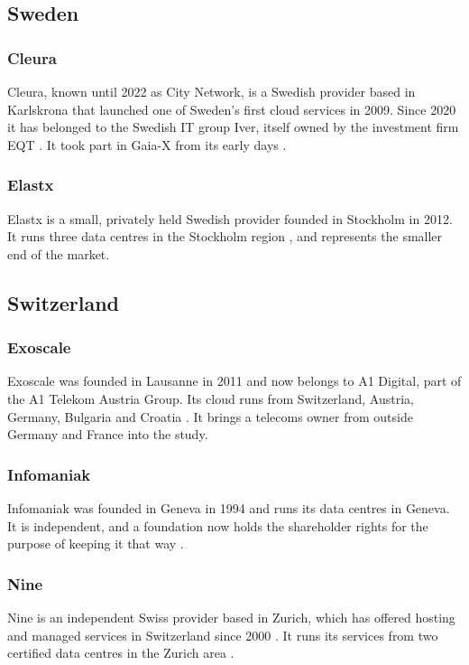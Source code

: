 \subsection{Sweden}

\subsubsection*{Cleura}
Cleura, known until 2022 as City Network, is a Swedish provider based in
Karlskrona that launched one of Sweden's first cloud services in 2009. Since 2020
it has belonged to the Swedish IT group Iver, itself owned by the investment firm
EQT \cite{Cleura_About,Cleura_Iver_2020}. It took part in Gaia-X from its early
days \cite{Cleura_GaiaX_2020}.

\subsubsection*{Elastx}
Elastx is a small, privately held Swedish provider founded in Stockholm in 2012.
It runs three data centres in the Stockholm region \cite{Elastx_About}, and
represents the smaller end of the market.

\subsection{Switzerland}

\subsubsection*{Exoscale}
Exoscale was founded in Lausanne in 2011 and now belongs to A1 Digital, part of
the A1 Telekom Austria Group. Its cloud runs from Switzerland, Austria, Germany,
Bulgaria and Croatia \cite{Exoscale_About}. It brings a telecoms owner from outside
Germany and France into the study.

\subsubsection*{Infomaniak}
Infomaniak was founded in Geneva in 1994 and runs its data centres in Geneva. It
is independent, and a foundation now holds the shareholder rights for the purpose
of keeping it that way \cite{Infomaniak_About}.

\subsubsection*{Nine}
Nine is an independent Swiss provider based in Zurich, which has offered hosting
and managed services in Switzerland since 2000 \cite{Nine_About}. It runs its
services from two certified data centres in the Zurich area
\cite{Nine_Infrastructure}.

